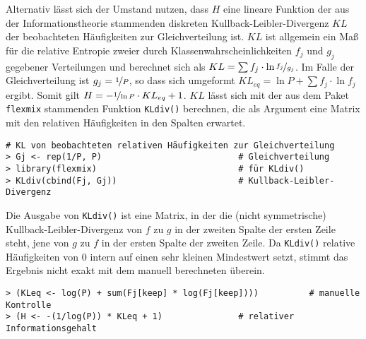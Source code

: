 Alternativ lässt sich der Umstand nutzen, dass $H$ eine lineare Funktion der aus der Informationstheorie stammenden diskreten Kullback-Leibler-Divergenz $KL$ der beobachteten Häufigkeiten zur Gleichverteilung ist. $KL$ ist allgemein ein Maß für die relative Entropie zweier durch Klassenwahrscheinlichkeiten $f_{j}$ und $g_{j}$ gegebener Verteilungen und berechnet sich als $KL = \sum{f_{j} \cdot \ln{\nicefrac{f_{j}}{g_{j}}}}$. Im Falle der Gleichverteilung ist $g_{j} = \nicefrac{1}{P}$, so dass sich umgeformt $KL_{eq} = \ln{P} + \sum{f_{j} \cdot \ln{f_{j}}}$ ergibt. Somit gilt $H = -\nicefrac{1}{\ln{P}} \cdot KL_{eq} + 1$. $KL$ lässt sich mit der aus dem Paket \lstinline!flexmix! \cite{Grun2008} stammenden Funktion \lstinline!KLdiv()! berechnen, die als Argument eine Matrix mit den relativen Häufigkeiten in den Spalten erwartet.
\begin{lstlisting}
# KL von beobachteten relativen Häufigkeiten zur Gleichverteilung
> Gj <- rep(1/P, P)                           # Gleichverteilung
> library(flexmix)                            # für KLdiv()
> KLdiv(cbind(Fj, Gj))                        # Kullback-Leibler-Divergenz
\end{lstlisting}

Die Ausgabe von \lstinline!KLdiv()! ist eine Matrix, in der die (nicht symmetrische) Kullback-Leibler-Divergenz von $f$ zu $g$ in der zweiten Spalte der ersten Zeile steht, jene von $g$ zu $f$ in der ersten Spalte der zweiten Zeile. Da \lstinline!KLdiv()! relative Häufigkeiten von $0$ intern auf einen sehr kleinen Mindestwert setzt, stimmt das Ergebnis nicht exakt mit dem manuell berechneten überein.
\begin{lstlisting}
> (KLeq <- log(P) + sum(Fj[keep] * log(Fj[keep])))          # manuelle Kontrolle
> (H <- -(1/log(P)) * KLeq + 1)               # relativer Informationsgehalt
\end{lstlisting}
